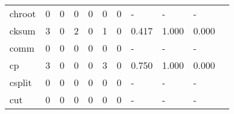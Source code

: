 \begin{longtable}{lp{1.2cm}p{1.2cm}p{1.2cm}p{1.2cm}p{1.2cm}p{1.2cm}p{1.2cm}p{1.2cm}p{1.2cm}p{1.2cm}}
chroot    &                                     0 &                                                  0 &                                                  0 &                                                  0 &                                                  0 &                                                  0 &                                                  - &                                                  - &                                                  - \\
cksum     &                                     3 &                                                  0 &                                                  2 &                                                  0 &                                                  1 &                                                  0 &                                              0.417 &                                              1.000 &                                              0.000 \\
comm      &                                     0 &                                                  0 &                                                  0 &                                                  0 &                                                  0 &                                                  0 &                                                  - &                                                  - &                                                  - \\
cp        &                                     3 &                                                  0 &                                                  0 &                                                  0 &                                                  3 &                                                  0 &                                              0.750 &                                              1.000 &                                              0.000 \\
csplit    &                                     0 &                                                  0 &                                                  0 &                                                  0 &                                                  0 &                                                  0 &                                                  - &                                                  - &                                                  - \\
cut       &                                     0 &                                                  0 &                                                  0 &                                                  0 &                                                  0 &                                                  0 &                                                  - &                                                  - &                                                  - \\

\end{longtable}
